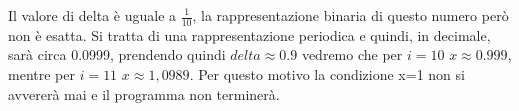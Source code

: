 
Il valore di delta è uguale a \(\frac{1}{10}\), la rappresentazione binaria di questo numero però non è esatta.
Si tratta di una rappresentazione periodica e quindi, in decimale, sarà circa 0.0999, prendendo quindi $delta\approx0.9$ vedremo che per $i=10$ $x\approx0.999$, mentre per $i=11$  $x\approx1,0989$. Per questo motivo la condizione x=1 non si avvererà mai e il programma non terminerà.